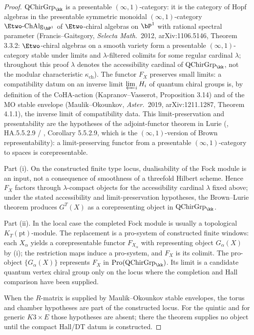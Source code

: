 \begin{proof}
$\mathrm{QChirGrp}_\kk$ is a presentable $(\infty,1)$-category: it is the category of Hopf algebras in the presentable symmetric monoidal $(\infty,1)$-category $\Etwo\text{-}\mathrm{ChAlg}_{\bP^1}$ of $\Etwo$-chiral algebras on $\bP^1$ with rational spectral parameter (Francis--Gaitsgory, \emph{Selecta Math.}\ 2012, arXiv:1106.5146, Theorem 3.3.2: $\Etwo$-chiral algebras on a smooth variety form a presentable $(\infty,1)$-category stable under limits and $\lambda$-filtered colimits for some regular cardinal $\lambda$; throughout this proof $\lambda$ denotes the accessibility cardinal of $\mathrm{QChirGrp}_\kk$, not the modular characteristic $\kappa_{\mathrm{ch}}$). The functor $F_X$ preserves small limits: a compatibility datum on an inverse limit $\varprojlim_i H_i$ of quantum chiral groups is, by definition of the CoHA-action (Kapranov--Vasserot, Proposition 3.14) and of the MO stable envelope (Maulik--Okounkov, \emph{Aster.}\ 2019, arXiv:1211.1287, Theorem 4.1.1), the inverse limit of compatibility data. This limit-preservation and presentability are the hypotheses of the adjoint-functor theorem in Lurie (\cite{LurieHA}, HA.5.5.2.9 / \cite{LurieHA}, Corollary 5.5.2.9, which is the $(\infty,1)$-version of Brown representability): a limit-preserving functor from a presentable $(\infty,1)$-category to spaces is corepresentable.

\smallskip
Part (i). On the constructed finite type locus, dualisability of the
Fock module is an input, not a consequence of smoothness of a threefold
Hilbert scheme. Hence \(F_X\) factors through \(\lambda\)-compact objects
for the accessibility cardinal \(\lambda\) fixed above; under the stated
accessibility and limit-preservation hypotheses, the Brown--Lurie
theorem produces \(G^{T}(X)\) as a corepresenting object in
\(\mathrm{QChirGrp}_\kk\).

\smallskip
Part (ii). In the local case the completed Fock module is usually a
topological \(K_T(\mathrm{pt})\)-module. The replacement is a pro-system
of constructed finite windows: each \(X_\alpha\) yields a
corepresentable functor \(F_{X_\alpha}\) with representing object
\(G_\alpha(X)\) by (i); the restriction maps induce a pro-system, and
\(F_X\) is its colimit. The pro-object \(\{G_\alpha(X)\}\) represents
\(F_X\) in \(\mathrm{Pro}(\mathrm{QChirGrp}_\kk)\). Its limit is a
candidate quantum vertex chiral group only on the locus where the
completion and Hall comparison have been supplied.

\smallskip
When the \(R\)-matrix is supplied by Maulik--Okounkov stable envelopes,
the torus and chamber hypotheses are part of the constructed locus. For
the quintic and for generic \(K3\times E\) those hypotheses are absent;
there the theorem supplies no object until the compact Hall/DT datum is
constructed.
\end{proof}

